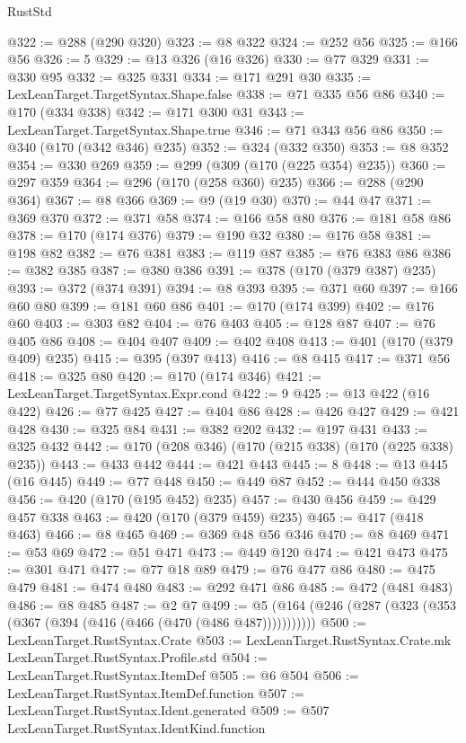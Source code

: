 \begin{lexlean}{RustStd}
\begin{coremodule}
@322 := @288 (@290 @320)
@323 := @8 @322
@324 := @252 @56
@325 := @166 @56
@326 := 5
@329 := @13 @326 (@16 @326)
@330 := @77 @329
@331 := @330 @95
@332 := @325 @331
@334 := @171 @291 @30
@335 := LexLeanTarget.TargetSyntax.Shape.false
@338 := @71 @335 @56 @86
@340 := @170 (@334 @338)
@342 := @171 @300 @31
@343 := LexLeanTarget.TargetSyntax.Shape.true
@346 := @71 @343 @56 @86
@350 := @340 (@170 (@342 @346) @235)
@352 := @324 (@332 @350)
@353 := @8 @352
@354 := @330 @269
@359 := @299 (@309 (@170 (@225 @354) @235))
@360 := @297 @359
@364 := @296 (@170 (@258 @360) @235)
@366 := @288 (@290 @364)
@367 := @8 @366
@369 := @9 (@19 @30)
@370 := @44 @47
@371 := @369 @370
@372 := @371 @58
@374 := @166 @58 @80
@376 := @181 @58 @86
@378 := @170 (@174 @376)
@379 := @190 @32
@380 := @176 @58
@381 := @198 @82
@382 := @76 @381
@383 := @119 @87
@385 := @76 @383 @86
@386 := @382 @385
@387 := @380 @386
@391 := @378 (@170 (@379 @387) @235)
@393 := @372 (@374 @391)
@394 := @8 @393
@395 := @371 @60
@397 := @166 @60 @80
@399 := @181 @60 @86
@401 := @170 (@174 @399)
@402 := @176 @60
@403 := @303 @82
@404 := @76 @403
@405 := @128 @87
@407 := @76 @405 @86
@408 := @404 @407
@409 := @402 @408
@413 := @401 (@170 (@379 @409) @235)
@415 := @395 (@397 @413)
@416 := @8 @415
@417 := @371 @56
@418 := @325 @80
@420 := @170 (@174 @346)
@421 := LexLeanTarget.TargetSyntax.Expr.cond
@422 := 9
@425 := @13 @422 (@16 @422)
@426 := @77 @425
@427 := @404 @86
@428 := @426 @427
@429 := @421 @428
@430 := @325 @84
@431 := @382 @202
@432 := @197 @431
@433 := @325 @432
@442 := @170 (@208 @346) (@170 (@215 @338) (@170 (@225 @338) @235))
@443 := @433 @442
@444 := @421 @443
@445 := 8
@448 := @13 @445 (@16 @445)
@449 := @77 @448
@450 := @449 @87
@452 := @444 @450 @338
@456 := @420 (@170 (@195 @452) @235)
@457 := @430 @456
@459 := @429 @457 @338
@463 := @420 (@170 (@379 @459) @235)
@465 := @417 (@418 @463)
@466 := @8 @465
@469 := @369 @48 @56 @346
@470 := @8 @469
@471 := @53 @69
@472 := @51 @471
@473 := @449 @120
@474 := @421 @473
@475 := @301 @471
@477 := @77 @18 @89
@479 := @76 @477 @86
@480 := @475 @479
@481 := @474 @480
@483 := @292 @471 @86
@485 := @472 (@481 @483)
@486 := @8 @485
@487 := @2 @7
@499 := @5 (@164 (@246 (@287 (@323 (@353 (@367 (@394 (@416 (@466 (@470 (@486 @487)))))))))))
@500 := LexLeanTarget.RustSyntax.Crate
@503 := LexLeanTarget.RustSyntax.Crate.mk LexLeanTarget.RustSyntax.Profile.std
@504 := LexLeanTarget.RustSyntax.ItemDef
@505 := @6 @504
@506 := LexLeanTarget.RustSyntax.ItemDef.function
@507 := LexLeanTarget.RustSyntax.Ident.generated
@509 := @507 LexLeanTarget.RustSyntax.IdentKind.function

\end{coremodule}
\end{lexlean}
